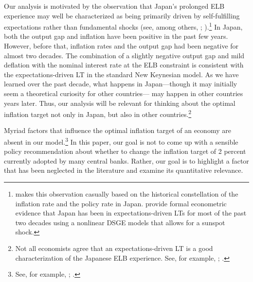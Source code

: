 \documentclass[11pt]{article}
\begin{document}
	Our analysis is motivated by the observation that Japan's prolonged ELB experience may well be characterized as being primarily driven by self-fulfilling expectations rather than fundamental shocks (see, among others, \citet{AruobaCubaBordaSchorfheide2018}; \citet{Bullard2010}).\footnote{\citet{Bullard2010} makes this observation casually based on the historical constellation of the inflation rate and the policy rate in Japan. \citet{AruobaCubaBordaSchorfheide2018} provide formal econometric evidence that Japan has been in expectations-driven LTs for most of the past two decades using a nonlinear DSGE models that allows for a sunspot shock.} In Japan, both the output gap and inflation have been positive in the past few years. However, before that, inflation rates and the output gap had been negative for almost two decades. The combination of a slightly negative output gap and mild deflation with the nominal interest rate at the ELB constraint is consistent with the expectations-driven LT in the standard New Keynesian model. As we have learned over the past decade, what happens in Japan---though it may initially seem a theoretical curiosity for other countries--- may happen in other countries years later. Thus, our analysis will be relevant for thinking about the optimal inflation target not only in Japan, but also in other countries.\footnote{Not all economists agree that an expectations-driven LT is a good characterization of the Japanese ELB experience. See, for example, \citet{NishizakiSekineUeno2014}; \citet{Eichenbaum2017}.} 
	
	
	Myriad factors that influence the optimal inflation target of an economy are absent in our model.\footnote{See, for example, \citet{KileyMauskopfWilcox2007}; \citet{KryvtsovMendes2015}.} In this paper, our goal is not to come up with a sensible policy recommendation about whether to change the inflation target of 2 percent currently adopted by many central banks. Rather, our goal is to highlight a factor that has been neglected in the literature and examine its quantitative relevance.
	
\end{document}
